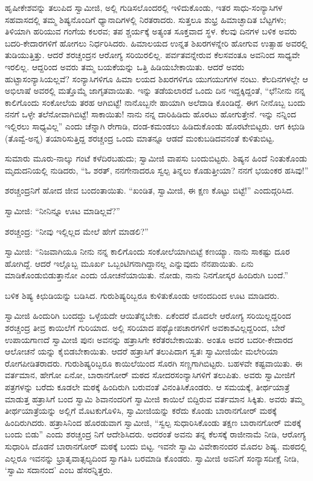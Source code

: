 ಹೃಷೀಕೇಶವನ್ನು ತಲುಪಿದ ಸ್ವಾಮೀಜಿ, ಅಲ್ಲಿ ಗುಡಿಸಲೊಂದರಲ್ಲಿ ಇಳಿದುಕೊಂಡು, ಇತರ ಸಾಧು-ಸಂನ್ಯಾಸಿಗಳ ಸಹವಾಸದಲ್ಲಿ ತಮ್ಮ ಶಿಷ್ಯನೊಂದಿಗೆ ಧ್ಯಾನಾದಿಗಳಲ್ಲಿ ನಿರತರಾದರು. ಸುತ್ತಲೂ ಶುಭ್ರ ಹಿಮಾಚ್ಛಾದಿತ ಬೆಟ್ಟಗಳು; ತಿಳಿಯಾಗಿ ಹರಿಯುವ ಗಂಗೆಯ ಕಲರವ; ತಪ ಶ್ಚರ್ಯಕ್ಕೆ ಅತ್ಯಂತ ಸೂಕ್ತವಾದ ಸ್ಥಳ. ಕೆಲವು ದಿನಗಳ ಬಳಿಕ ಅವರು ಬದರಿ-ಕೇದಾರಗಳಿಗೆ ಹೋಗಲು ನಿರ್ಧರಿಸಿದರು. ಹಿಮಾಲಯದ ಉನ್ನತ ಶಿಖರಗಳನ್ನೇರಿ ಹೋಗುವ ಉತ್ಸಾಹ ಅವರಲ್ಲಿ ತುಡಿಯುತ್ತಿತ್ತು. ಆದರೆ ಶರಚ್ಚಂದ್ರನ ಆರೋಗ್ಯ ಸರಿಯಿರಲಿಲ್ಲ. ಪರ್ವತವನ್ನೇರುವ ಕೆಲಸವಂತೂ ಅವನಿಂದ ಸಾಧ್ಯವೇ ಇರಲಿಲ್ಲ. ಆದ್ದರಿಂದ ಅವರು ತಮ್ಮ ಬಯಕೆಯನ್ನು ಒತ್ತಿ ಹಿಡಿಯಬೇಕಾಯಿತು. ಆದರೆ ಅವರು ಹುಟ್ಟಾಸಂನ್ಯಾಸಿಯಲ್ಲವೆ? ಸಂನ್ಯಾಸಿಗಳಿಗೂ ಹಿಮಾ ಲಯದ ಶಿಖರಗಳಿಗೂ ಯುಗಯುಗಗಳ ನಂಟು. ಕೆಲದಿನಗಳಲ್ಲೇ ಆ ಅಭಿಲಾಷೆ ಅವರಲ್ಲಿ ಮತ್ತೊಮ್ಮೆ ಜಾಗೃತವಾಯಿತು. ಇನ್ನು ತಡೆಯಲಾರದೆ ಒಂದು ದಿನ ಇದ್ದಕ್ಕಿದ್ದಂತೆ, “ಛೆ!ನೀನು ನನ್ನ ಕಾಲಿಗೊಂದು ಸಂಕೋಲೆಯ ತರಹ ಆಗಿಬಿಟ್ಟೆ! ನಾನೊಬ್ಬನೇ ಹಾಯಾಗಿ ಅಲೆದಾಡಿ ಕೊಂಡಿದ್ದೆ. ಈಗ ನೀನೊಬ್ಬ ಬಂದು ನನಗೆ ಒಳ್ಳೇ ತಲೆನೋವಾಗಿಬಿಟ್ಟೆ! ಸಾಕಾಯಿತು! ನಾನು ನನ್ನ ದಾರಿಹಿಡಿದು ಹೊರಟು ಹೋಗುತ್ತೇನೆ. ಇನ್ನು ನನ್ನಿಂದ ಇಲ್ಲಿರಲು ಸಾಧ್ಯವಿಲ್ಲ” ಎಂದು ಚೆನ್ನಾಗಿ ರೇಗಾಡಿ, ದಂಡ-ಕಮಂಡಲು ಹಿಡಿದುಕೊಂಡು ಹೊರಟೇಬಿಟ್ಟರು. ಆಗ ಕಿಛುಡಿ (ತೊವ್ವೆ-ಅನ್ನ) ತಯಾರಿಸುತ್ತಿದ್ದ ಶರಚ್ಚಂದ್ರ ಒಂದು ಮಾತನ್ನೂ ಆಡದೆ ಮಂಕುಬಡಿದವನಂತೆ ಕುಳಿತುಬಿಟ್ಟ.

ಸುಮಾರು ಮೂರು-ನಾಲ್ಕು ಗಂಟೆ ಕಳೆದಿರಬಹುದು; ಸ್ವಾಮೀಜಿ ವಾಪಸು ಬಂದುಬಿಟ್ಟರು. ಶಿಷ್ಯನ ಹಿಂದೆ ನಿಂತುಕೊಂಡು ಮೃದುದನಿಯಲ್ಲಿ ನುಡಿದರು, “ಓ ಶರತ್, ನನಗೇನಾದರೂ ಸ್ವಲ್ಪ ತಿನ್ನಲು ಕೊಡುತ್ತೀಯಾ? ನನಗೆ ಭಯಂಕರ ಹಸಿವು!”

ಶರಚ್ಚಂದ್ರನಿಗೆ ಹೋದ ಜೀವ ಬಂದಂತಾಯಿತು. “ಖಂಡಿತ, ಸ್ವಾಮೀಜಿ, ಈ ಕ್ಷಣ ಕೊಟ್ಟು ಬಿಟ್ಟೆ!” ಎಂದುದ್ಗರಿಸಿದ.

ಸ್ವಾಮೀಜಿ: “ನೀನಿನ್ನೂ ಊಟ ಮಾಡಿಲ್ಲವೆ?”

ಶರಚ್ಚಂದ್ರ: “ನೀವು ಇಲ್ಲಿಲ್ಲದ ಮೇಲೆ ಹೇಗೆ ಮಾಡಲಿ?”

ಸ್ವಾಮೀಜಿ: “ನಿಜವಾಗಿಯೂ ನೀನು ನನ್ನ ಕಾಲಿಗೊಂದು ಸಂಕೋಲೆಯಾಗಿಬಿಟ್ಟೆ ಕಣಯ್ಯಾ. ನಾನು ಸಾಕಷ್ಟು ದೂರ ಹೋಗಿದ್ದೆ. ಆದರೆ ಇಲ್ಲೊಬ್ಬ ಮೂರ್ಖ ಒಬ್ಬಂಟಿಗನಾಗಿದ್ದಾನಲ್ಲ ಎನ್ನುವುದು ನೆನಪಾಯಿತು. ಏನು ಮಾಡಿಕೊಂಡುಬಿಡುತ್ತಾನೋ ಎಂದು ಯೋಚನೆಯಾಯಿತು. ನೋಡು, ನಾನು ನಿನಗೋಸ್ಕರ ಹಿಂದಿರುಗಿ ಬಂದೆ.”

ಬಳಿಕ ಶಿಷ್ಯ ಕಿಛುಡಿಯನ್ನು ಬಡಿಸಿದ. ಗುರುಶಿಷ್ಯರಿಬ್ಬರೂ ಕುಳಿತುಕೊಂಡು ಆನಂದದಿಂದ ಊಟ ಮಾಡಿದರು.

ಸ್ವಾಮೀಜಿ ಹಿಂದುರಿಗಿ ಬಂದದ್ದು ಒಳ್ಳೆಯದೇ ಆಯಿತೆನ್ನಬೇಕು. ಏಕೆಂದರೆ ಮೊದಲೇ ಆರೋಗ್ಯ ಸರಿಯಿಲ್ಲದ್ದರಿಂದ ಶರಚ್ಚಂದ್ರ ತೀವ್ರ ಕಾಯಿಲೆಗೆ ಗುರಿಯಾದ. ಅಲ್ಲಿ ಸರಿಯಾದ ಪಥ್ಯೋಪಚಾರಗಳಿಗೆ ಅವಕಾಶವಿಲ್ಲದ್ದರಿಂದ, ಬೇರೆ ಉಪಾಯಗಾಣದೆ ಸ್ವಾಮೀಜಿ ಪುನಃ ಅವನನ್ನು ಹತ್ರಾಸಿಗೇ ಕರೆತರಬೇಕಾಯಿತು. ಅಂತೂ ಅವರ ಬದರೀ-ಕೇದಾರದ ಆಲೋಚನೆ ಯನ್ನು ಕೈಬಿಡಬೇಕಾಯಿತು. ಆದರೆ ಹತ್ರಾಸಿಗೆ ತಲುಪಿದಾಗ ಸ್ವತಃ ಸ್ವಾಮೀಜಿಯೇ ಮಲೇರಿಯಾ ರೋಗಪೀಡಿತರಾದರು. ಗುರುಶಿಷ್ಯರಿಬ್ಬರೂ ಕಾಯಿಲೆಯಿಂದ ಸೊರಗಿ ಸಣ್ಣಗಾಗಿಬಿಟ್ಟರು. ಬಹಳವೇ ಕಷ್ಟವಾಯಿತು. ಈ ವರ್ತಮಾನ, ಹೇಗೋ ಏನೋ, ಬಾರಾನಗೋರ್ ಮಠದ ಸೋದರಸಂನ್ಯಾಸಿಗಳಿಗೆ ತಲುಪಿತು. ಅವರು ಸ್ವಾಮೀಜಿಗೆ ಪತ್ರಗಳನ್ನು ಬರೆದು ಕೂಡಲೇ ಮಠಕ್ಕೆ ಹಿಂದಿರುಗಿ ಬರುವಂತೆ ವಿನಂತಿಸಿಕೊಂಡರು. ಆ ಸಮಯಕ್ಕೆ, ತೀರ್ಥಯಾತ್ರೆ ಮಾಡುತ್ತ ಹತ್ರಾಸಿಗೆ ಬಂದ ಸ್ವಾಮಿ ಶಿವಾನಂದರಿಗೆ ಸ್ವಾಮೀಜಿ ಕಾಯಿಲೆ ಬಿದ್ದಿರುವ ವರ್ತಮಾನ ಸಿಕ್ಕಿತು. ಅವರು ತಮ್ಮ ತೀರ್ಥಯಾತ್ರೆಯನ್ನು ಅಲ್ಲಿಗೆ ಮೊಟಕುಗೊಳಿಸಿ, ಸ್ವಾಮೀಜಿಯನ್ನು ಕರೆದು ಕೊಂಡು ಬಾರಾನಗೋರ್ ಮಠಕ್ಕೆ ಹಿಂದಿರುಗಿದರು. ಹತ್ರಾಸಿನಿಂದ ಹೊರಡುವಾಗ ಸ್ವಾಮೀಜಿ, “ಸ್ವಲ್ಪ ಸುಧಾರಿಸಿಕೊಂಡು ತಕ್ಷಣ ಬಾರಾನಗೋರ್ ಮಠಕ್ಕೆ ಬಂದು ಬಿಡು” ಎಂದು ಶರಚ್ಚಂದ್ರ ನಿಗೆ ಆದೇಶಿಸಿದರು. ಅದರಂತೆ ಅವನು ತನ್ನ ಕೆಲಸಕ್ಕೆ ರಾಜೀನಾಮೆ ನೀಡಿ, ಆರೋಗ್ಯ ಸುಧಾರಿಸಿ ದೊಡನೆ ಬಾರಾನಗೋರ್ ಮಠಕ್ಕೆ ಬಂದು ಬಿಟ್ಟ. ಇವನೇ ಸ್ವಾಮಿ ವಿವೇಕಾನಂದರ ಮೊದಲ ಶಿಷ್ಯ. ಮಠದಲ್ಲಿ ಎಲ್ಲರೂ ಇವನನ್ನು ಭ್ರಾತೃವಾತ್ಸಲ್ಯದಿಂದ ಸ್ವಾಗತಿಸಿ ಬರಮಾಡಿ ಕೊಂಡರು. ಸ್ವಾಮೀಜಿ ಅವನಿಗೆ ಸಂನ್ಯಾಸದೀಕ್ಷೆ ನೀಡಿ, ‘ಸ್ವಾಮಿ ಸದಾನಂದ’ ಎಂಬ ಹೆಸರನ್ನಿತ್ತರು.

